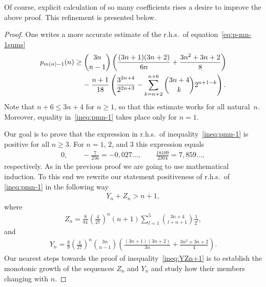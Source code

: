 \documentclass[pdftex]{sigma}
\numberwithin{equation}{section}
\begin{document}
Of course, explicit calculation of so many coefficients rises a desire to improve the above proof. This refinement is presented below.
\begin{proof}
One writes a more accurate estimate of the r.h.s.\ of equation~\eqref{eq:p-mn-1sums}
\begin{gather}
p_{m(n)-1}(n) \geq \binom{3n}{n-1} \left(\frac{(3n+1)(3n+2)}{6n}+\frac{3n^2+3n+2}{8}\right)\nonumber\\
\hphantom{p_{m(n)-1}(n) \geq}{} -\frac{n+1}{18}\left(\frac{3^{3n+4}}{2^{2n+3}}
- \sum\limits_{k=n+2}^{n+6} \binom{3n+4}{k}2^{n+1-k} \right) .\label{ineq:pmn-1}
\end{gather}
Note that $n+6\leq3n+4$ for $n\geq1$, so that this estimate works for all natural~$n$. Moreover, equality in~\eqref{ineq:pmn-1} takes place only for $n=1$.

Our goal is to prove that the expression in r.h.s.\ of inequality~\eqref{ineq:pmn-1} is positive for all $n\geq3$.
For $n=1$, $2$, and $3$ this expression equals
\begin{gather*}
0,\qquad-\frac{7}{256}=-0,027\ldots,\qquad\frac{18109}{2304}=7,859\ldots,
\end{gather*}
respectively. As in the previous proof we are going to use mathematical induction. To this end we rewrite our
statement positiveness of r.h.s.\ of \eqref{ineq:pmn-1} in the following way
\begin{gather}\label{ineq:YZn+1}
Y_n+Z_n>n+1,
\end{gather}
where
\begin{gather*}
Z_n=\frac{8}{81}\left(\frac{4}{27}\right)^n(n+1)\sum\limits_{l=1}^5\binom{3n+4}{l+n+1}\frac1{2^l},
\end{gather*}
and
\begin{gather*}
Y_n=\frac{8}{9}\left(\frac{4}{27}\right)^n\binom{3n}{n-1}\left(\frac{(3n+1)(3n+2)}{3n}+\frac{3n^2+3n+2}{4}\right).
\end{gather*}
Our nearest steps towards the proof of inequality~\eqref{ineq:YZn+1} is to establish the monotonic growth of the
sequences $Z_n$ and $Y_n$ and study how their members changing with $n$.


\end{proof}
\end{document}
